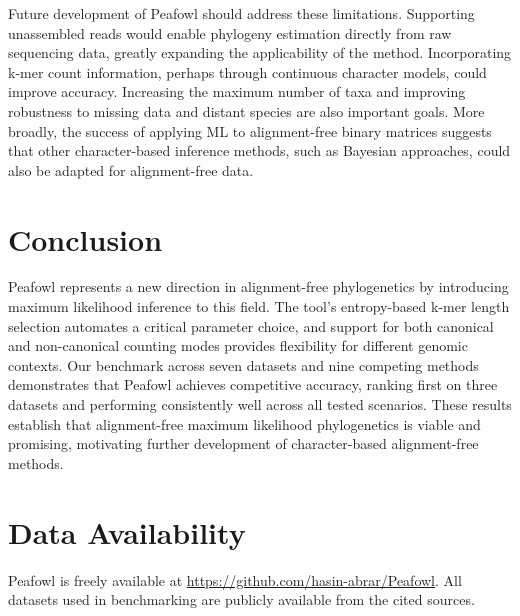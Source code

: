 \documentclass[12pt]{article}
\begin{document}
Future development of Peafowl should address these limitations. Supporting unassembled reads would enable phylogeny estimation directly from raw sequencing data, greatly expanding the applicability of the method. Incorporating k-mer count information, perhaps through continuous character models, could improve accuracy. Increasing the maximum number of taxa and improving robustness to missing data and distant species are also important goals. More broadly, the success of applying ML to alignment-free binary matrices suggests that other character-based inference methods, such as Bayesian approaches, could also be adapted for alignment-free data.

\section{Conclusion}

Peafowl represents a new direction in alignment-free phylogenetics by introducing maximum likelihood inference to this field. The tool's entropy-based k-mer length selection automates a critical parameter choice, and support for both canonical and non-canonical counting modes provides flexibility for different genomic contexts. Our benchmark across seven datasets and nine competing methods demonstrates that Peafowl achieves competitive accuracy, ranking first on three datasets and performing consistently well across all tested scenarios. These results establish that alignment-free maximum likelihood phylogenetics is viable and promising, motivating further development of character-based alignment-free methods.

\section*{Data Availability}

Peafowl is freely available at \url{https://github.com/hasin-abrar/Peafowl}. All datasets used in benchmarking are publicly available from the cited sources.



\end{document}
